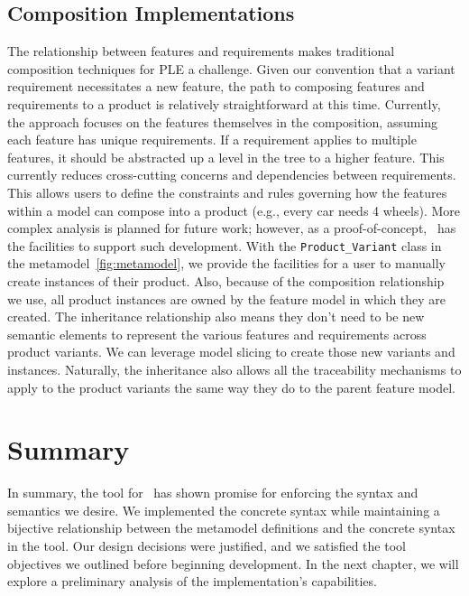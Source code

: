 \subsection{Composition Implementations}

The relationship between features and requirements makes traditional composition techniques for \gls{PLE} a challenge. Given our convention that a variant requirement necessitates a new feature, the path to composing features and requirements to a product is relatively straightforward at this time. Currently, the approach focuses on the features themselves in the composition, assuming each feature has unique requirements. If a requirement applies to multiple features, it should be abstracted up a level in the tree to a higher feature. This currently reduces cross-cutting concerns and dependencies between requirements. This allows users to define the constraints and rules governing how the features within a model can compose into a product (e.g., every car needs 4 wheels). More complex analysis is planned for future work; however, as a proof-of-concept, \tool\ has the facilities to support such development. With the \texttt{Product\_Variant} class in the metamodel~\ref{fig:metamodel}, we provide the facilities for a user to manually create instances of their product. Also, because of the composition relationship we use, all product instances are owned by the feature model in which they are created. The inheritance relationship also means they don't need to be new semantic elements to represent the various features and requirements across product variants. We can leverage model slicing to create those new variants and instances. Naturally, the inheritance also allows all the traceability mechanisms to apply to the product variants the same way they do to the parent feature model.

\section{Summary}
In summary, the tool for \tool\ has shown promise for enforcing the syntax and semantics we desire. We implemented the concrete syntax while maintaining a bijective relationship between the metamodel definitions and the concrete syntax in the tool. Our design decisions were justified, and we satisfied the tool objectives we outlined before beginning development. In the next chapter, we will explore a preliminary analysis of the implementation's capabilities. 